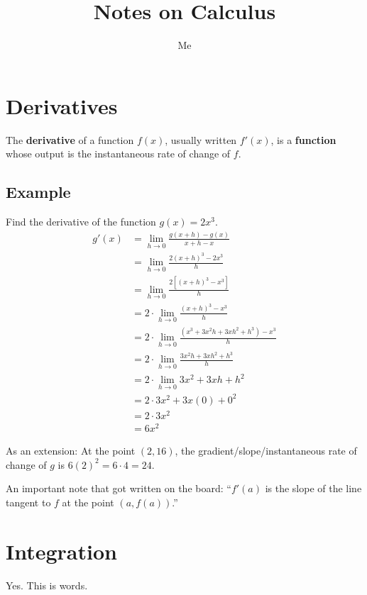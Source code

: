 \documentclass{article}
\title{Notes on Calculus}
\author{Me}
\begin{document}
\maketitle

\section{Derivatives}
The \textbf{derivative} of a function $f(x)$, usually written $f'(x)$, is a \textbf{function} whose output is the instantaneous rate of change of $f$.

\subsection{Example}
Find the derivative of the function $g(x)=2x^3$.
\begin{align*}
g'(x)
& = \lim_{h \to 0} \frac{g(x+h)-g(x)}{x+h-x} \\
& = \lim_{h \to 0} \frac{2(x+h)^3-2x^3}{h} \\
& =\lim_{h \to 0} \frac{2[(x+h)^3-x^3]}{h} \\
& = 2 \cdot \lim_{h \to 0} \frac{(x+h)^3-x^3}{h} \\
& = 2 \cdot \lim_{h \to 0} \frac{(x^3+3x^2h+3xh^2+h^3)-x^3}{h} \\
& = 2 \cdot \lim_{h \to 0} \frac{3x^2h+3xh^2+h^3}{h} \\
& = 2 \cdot \lim_{h \to 0} 3x^2+3xh+h^2 \\
& = 2 \cdot 3x^2+3x(0)+0^2 \\
& = 2 \cdot 3x^2 \\
& = \boxed{6x^2}
\end{align*}

As an extension: At the point $(2, 16)$, the gradient/slope/instantaneous rate of change of $g$ is $6(2)^2=6\cdot4=\boxed{24}$.

An important note that got written on the board: ``$f'(a)$ is the slope of the line tangent to $f$ at the point $(a, f(a))$.''

\section{Integration}
Yes. This is words.
\end{document}
